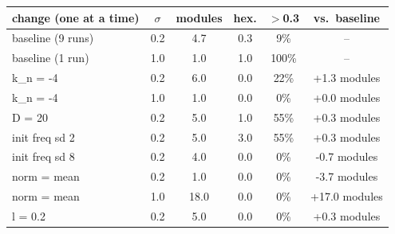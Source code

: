 \begin{tabular}{lccccc}
\toprule
change (one at a time) & $\sigma$ & modules & hex. & $>$0.3 & vs.\ baseline \\
\midrule
baseline (9 runs) & 0.2 & 4.7 & 0.3 & 9\% & -- \\
baseline (1 run) & 1.0 & 1.0 & 1.0 & 100\% & -- \\
k_n = -4 & 0.2 & 6.0 & 0.0 & 22\% & +1.3 modules \\
k_n = -4 & 1.0 & 1.0 & 0.0 & 0\% & +0.0 modules \\
D = 20 & 0.2 & 5.0 & 1.0 & 55\% & +0.3 modules \\
init freq sd 2 & 0.2 & 5.0 & 3.0 & 55\% & +0.3 modules \\
init freq sd 8 & 0.2 & 4.0 & 0.0 & 0\% & -0.7 modules \\
norm = mean & 0.2 & 1.0 & 0.0 & 0\% & -3.7 modules \\
norm = mean & 1.0 & 18.0 & 0.0 & 0\% & +17.0 modules \\
l = 0.2 & 0.2 & 5.0 & 0.0 & 0\% & +0.3 modules \\
\bottomrule
\end{tabular}
